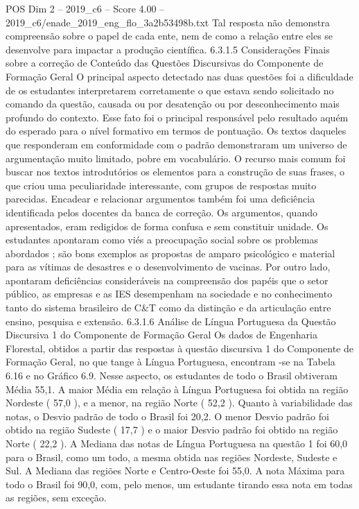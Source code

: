 \begin{textsample}{POS Dim 2 – 2019\_c6 – Score 4.00 – 2019\_c6/enade\_2019\_eng\_flo\_3a2b53498b.txt}
Tal resposta não demonstra compreensão sobre o papel de cada ente, nem de como a relação entre eles se desenvolve para impactar a produção científica. 6.3.1.5 Considerações Finais sobre a correção de Conteúdo das Questões Discursivas do Componente de Formação Geral O principal aspecto detectado nas duas questões foi a dificuldade de os estudantes interpretarem corretamente o que estava sendo solicitado no comando da questão, causada ou por desatenção ou por desconhecimento mais profundo do contexto.
Esse fato foi o principal responsável pelo resultado aquém do esperado para o nível formativo em termos de pontuação.
Os textos daqueles que responderam em conformidade com o padrão demonstraram um universo de argumentação muito limitado, pobre em vocabulário.
O recurso mais comum foi buscar nos textos introdutórios os elementos para a construção de suas frases, o que criou uma peculiaridade interessante, com grupos de respostas muito parecidas.
Encadear e relacionar argumentos também foi uma deficiência identificada pelos docentes da banca de correção.
Os argumentos, quando apresentados, eram redigidos de forma confusa e sem constituir unidade.
Os estudantes apontaram como viés a preocupação social sobre os problemas abordados ; são bons exemplos as propostas de amparo psicológico e material para as vítimas de desastres e o desenvolvimento de vacinas.
Por outro lado, apontaram deficiências consideráveis na compreensão dos papéis que o setor público, as empresas e as IES desempenham na sociedade e no conhecimento tanto do sistema brasileiro de C\&T como da distinção e da articulação entre ensino, pesquisa e extensão. 6.3.1.6 Análise de Língua Portuguesa da Questão Discursiva 1 do Componente de Formação Geral Os dados de Engenharia Florestal, obtidos a partir das respostas à questão discursiva 1 do Componente de Formação Geral, no que tange à Língua Portuguesa, encontram -se na Tabela 6.16 e no Gráfico 6.9.
Nesse aspecto, os estudantes de todo o Brasil obtiveram Média 55,1.
A maior Média em relação à Língua Portuguesa foi obtida na região Nordeste ( 57,0 ), e a menor, na região Norte ( 52,2 ).
Quanto à variabilidade das notas, o Desvio padrão de todo o Brasil foi 20,2.
O menor Desvio padrão foi obtido na região Sudeste ( 17,7 ) e o maior Desvio padrão foi obtido na região Norte ( 22,2 ).
A Mediana das notas de Língua Portuguesa na questão 1 foi 60,0 para o Brasil, como um todo, a mesma obtida nas regiões Nordeste, Sudeste e Sul.
A Mediana das regiões Norte e Centro-Oeste foi 55,0.
A nota Máxima para todo o Brasil foi 90,0, com, pelo menos, um estudante tirando essa nota em todas as regiões, sem exceção.

\end{textsample}
